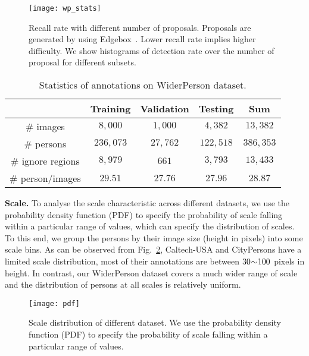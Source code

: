 \documentclass[journal]{IEEEtran}
\begin{document}
\begin{figure}
\begin{centering}
\texttt{[image: wp\_stats]}
\par\end{centering}
\caption{Recall rate with different number of proposals. Proposals are generated by using Edgebox~\cite{DBLP:conf/eccv/ZitnickD14}. Lower recall rate implies higher difficulty. We show histograms of detection rate over the number of proposal for different subsets.}
\label{fig:wp_stats}
\end{figure}

\begin{table}[t]
\caption{Statistics of annotations on WiderPerson dataset.}
\label{tab:Statistics-bb}
\begin{centering}
\setlength{\tabcolsep}{7.5pt}
\begin{tabular}{c|ccc|c}
\toprule[2pt]
 & Training & Validation & Testing & Sum \\
\midrule
{\# images} & $8,000$ & $1,000$ & $4,382$ & $13,382$ \\
\# persons & $236,073$ & $27,762$ & $122,518$ & $386,353$ \\
\# ignore regions & $8,979$ & $661$ & $3,793$ & $13,433$ \\
\# person/images & $29.51$ & $27.76$ & $27.96$ & $28.87$ \\
\bottomrule[2pt]
\end{tabular}
\par\end{centering}
\end{table}

{\flushleft \textbf{Scale. }}
To analyse the scale characteristic across different datasets, we use the probability density function (PDF) to specify the probability of scale falling within a particular range of values, which can specify the distribution of scales. To this end, we group the persons by their image size (height in pixels) into some scale bins. As can be observed from Fig.~\ref{fig:scale}, Caltech-USA and CityPersons have a limited scale distribution, most of their annotations are between $30\negmedspace\sim\negmedspace100$ pixels in height. In contrast, our WiderPerson dataset covers a much wider range of scale and the distribution of persons at all scales is relatively uniform.

\begin{figure}[t]
\centering
\label{fig:scale}
\texttt{[image: pdf]}
\caption{Scale distribution of different dataset. We use the probability density function (PDF) to specify the probability of scale falling within a particular range of values.}
\label{fig:scale}
\end{figure}
\end{document}
